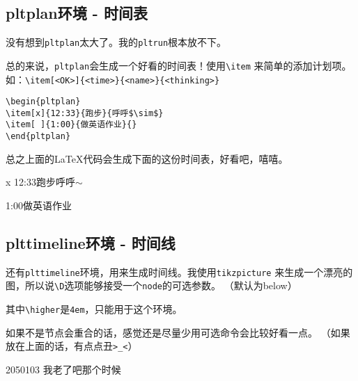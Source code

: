 \documentclass{peterlitsdoc}
\newcommand{\vb}{\verb}
\begin{document}

\subsection{pltplan环境 - 时间表}

没有想到\vb|pltplan|太大了。我的\vb|pltrun|根本放不下。

总的来说，\vb|pltplan|会生成一个好看的时间表！使用\vb|\item|
来简单的添加计划项。如：\vb|\item[<OK>]{<time>}{<name>}{<thinking>}|

\begin{lstlisting}
\begin{pltplan}
\item[x]{12:33}{跑步}{呼呼$\sim$}
\item[ ]{1:00}{做英语作业}{}
\end{pltplan}
\end{lstlisting}

总之上面的\LaTeX{}代码会生成下面的这份时间表，好看吧，嘻嘻。

\begin{pltplan}
\item[x]{12:33}{跑步}{呼呼$\sim$}
\item[ ]{1:00}{做英语作业}{}
\end{pltplan}


\subsection{plttimeline环境 - 时间线}

还有\vb|plttimeline|环境，用来生成时间线。我使用\vb|tikzpicture|%
来生成一个漂亮的图，所以说\vb|\D|选项能够接受一个\vb|node|的可选参数。
（默认为below）

其中\vb|\higher|是\vb|4em|，只能用于这个环境。

如果不是节点会重合的话，感觉还是尽量少用可选命令会比较好看一点。
（如果放在上面的话，有点点丑\vb|>_<|）

\begin{pltrun}
\begin{plttimeline}{2050}{10}{3}
    {我老了吧那个时候}
\end{plttimeline}
\end{pltrun}
\end{document}
